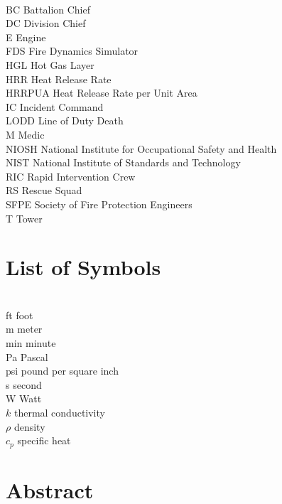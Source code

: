 \documentclass[12pt,oneside]{book}
\begin{document}
\begin{tabbing}
\hspace{1.5in} \= \\
BC \> Battalion Chief \\
DC \> Division Chief \\
E \> Engine \\
FDS \> Fire Dynamics Simulator \\
HGL \> Hot Gas Layer \\
HRR \> Heat Release Rate \\
HRRPUA \> Heat Release Rate per Unit Area \\
IC \> Incident Command \\
LODD \> Line of Duty Death \\
M \> Medic \\
NIOSH \> National Institute for Occupational Safety and Health \\
NIST \> National Institute of Standards and Technology \\
RIC \> Rapid Intervention Crew \\
RS \> Rescue Squad \\
SFPE \> Society of Fire Protection Engineers \\
T \> Tower \\
\end{tabbing}

\chapter{List of Symbols}

\begin{tabbing}
\hspace{1.5in} \= \\
ft \> foot \\
m \> meter \\
min \> minute \\
Pa \> Pascal \\
psi \> pound per square inch \\
s \> second \\
W \> Watt \\
$k$ \> thermal conductivity \\
$\rho$ \> density \\
$c_{p}$ \> specific heat \\
\end{tabbing}

\mainmatter


\chapter*{\centering Abstract}
\end{document}
